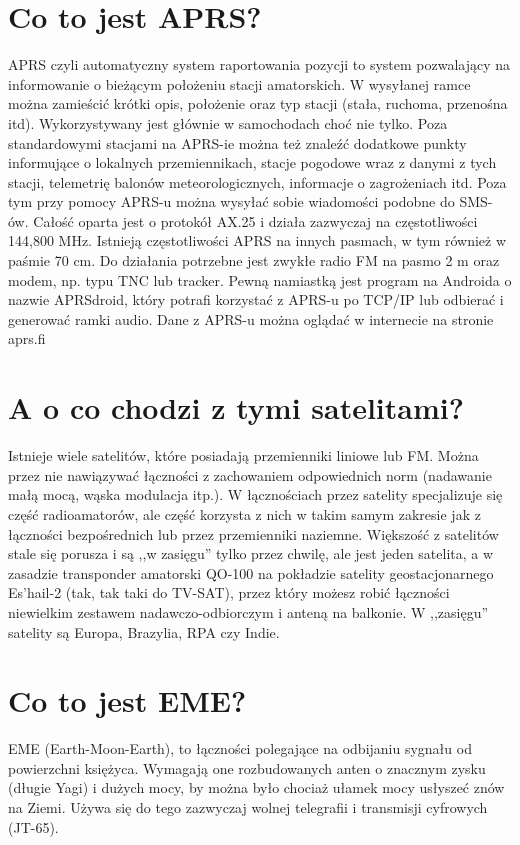 \documentclass[a4paper,12pt]{article}
\begin{document}
\section{Co to jest APRS?}
APRS czyli automatyczny system raportowania pozycji to system pozwalający na informowanie o bieżącym położeniu stacji amatorskich. W wysyłanej ramce można zamieścić krótki opis, położenie oraz typ stacji (stała, ruchoma, przenośna itd). Wykorzystywany jest głównie w samochodach choć nie tylko. Poza standardowymi stacjami na APRS-ie można też znaleźć dodatkowe punkty informujące o lokalnych przemiennikach, stacje pogodowe wraz z danymi z tych stacji, telemetrię balonów meteorologicznych, informacje o zagrożeniach itd. 
Poza tym przy pomocy APRS-u można wysyłać sobie wiadomości podobne do SMS-ów.
Całość oparta jest o protokół AX.25 i działa zazwyczaj na częstotliwości 144,800 MHz. Istnieją częstotliwości APRS na innych pasmach, w tym również w paśmie 70 cm.
Do działania potrzebne jest zwykłe radio FM na pasmo 2 m oraz modem, np. typu TNC lub tracker. 
Pewną namiastką jest program na Androida o nazwie APRSdroid, który potrafi korzystać z APRS-u po TCP/IP lub odbierać i generować ramki audio.
Dane z APRS-u można oglądać w internecie na stronie aprs.fi

\section{A o co chodzi z tymi satelitami?}
Istnieje wiele satelitów, które posiadają przemienniki liniowe lub FM. Można przez nie nawiązywać łączności z zachowaniem odpowiednich norm (nadawanie małą mocą, wąska modulacja itp.). W łącznościach przez satelity specjalizuje się część radioamatorów, ale część korzysta z nich w takim samym zakresie jak z łączności bezpośrednich lub przez przemienniki naziemne. Większość z satelitów stale się porusza i są ,,w zasięgu'' tylko przez chwilę, ale jest jeden satelita, a w zasadzie transponder amatorski QO-100 na pokładzie satelity geostacjonarnego Es'hail-2 (tak, tak taki do TV-SAT), przez który możesz robić łączności niewielkim zestawem nadawczo-odbiorczym i anteną na balkonie. W ,,zasięgu'' satelity są Europa, Brazylia, RPA czy Indie.

\section{Co to jest EME?}
EME (Earth-Moon-Earth), to łączności polegające na odbijaniu sygnału od powierzchni księżyca. Wymagają one rozbudowanych anten o znacznym zysku (długie Yagi) i dużych mocy, by można było chociaż ułamek mocy usłyszeć znów na Ziemi. Używa się do tego zazwyczaj wolnej telegrafii i transmisji cyfrowych (JT-65).
\end{document}
